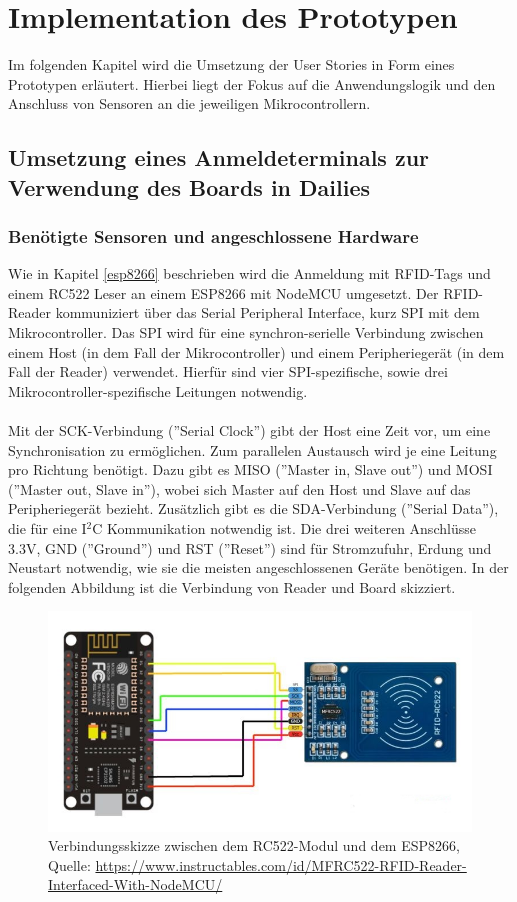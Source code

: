 \documentclass[12pt,titlepage]{scrartcl}
\begin{document}
	\section{Implementation des Prototypen}
	Im folgenden Kapitel wird die Umsetzung der User Stories in Form eines Prototypen erläutert. Hierbei liegt der Fokus auf die Anwendungslogik und den Anschluss von Sensoren an die jeweiligen Mikrocontrollern.
		\subsection{Umsetzung eines Anmeldeterminals zur Verwendung des Boards in Dailies}
			\subsubsection{Benötigte Sensoren und angeschlossene Hardware}
			Wie in Kapitel \ref{esp8266} beschrieben wird die Anmeldung mit RFID-Tags und einem RC522 Leser an einem ESP8266 mit NodeMCU umgesetzt. Der RFID-Reader kommuniziert über das Serial Peripheral Interface, kurz SPI \cite{spistandard} mit dem Mikrocontroller. Das SPI wird für eine synchron-serielle Verbindung zwischen einem Host (in dem Fall der Mikrocontroller) und einem Peripheriegerät (in dem Fall der Reader) verwendet. Hierfür sind vier SPI-spezifische, sowie drei Mikrocontroller-spezifische Leitungen notwendig. \\ \\
			Mit der SCK-Verbindung (''Serial Clock'') gibt der Host eine Zeit vor, um eine Synchronisation zu ermöglichen. Zum parallelen Austausch wird je eine Leitung pro Richtung benötigt. Dazu gibt es MISO (''Master in, Slave out'') und MOSI (''Master out, Slave in''), wobei sich Master auf den Host und Slave auf das Peripheriegerät bezieht. Zusätzlich gibt es die SDA-Verbindung (''Serial Data''), die für eine I$^2$C Kommunikation notwendig ist. Die drei weiteren Anschlüsse 3.3V, GND (''Ground'') und RST (''Reset'') sind für Stromzufuhr, Erdung und Neustart notwendig, wie sie die meisten angeschlossenen Geräte benötigen. In der folgenden Abbildung ist die Verbindung von Reader und Board skizziert.
		\begin{figure}[H] 
  			\centering
    		\includegraphics[height=0.3\textheight]{VerbindungRC522}
  			\caption{Verbindungsskizze zwischen dem RC522-Modul und dem ESP8266, Quelle: \url{https://www.instructables.com/id/MFRC522-RFID-Reader-Interfaced-With-NodeMCU/}}
  			\label{fig:VerbindungRC522}
		\end{figure}
\end{document}
